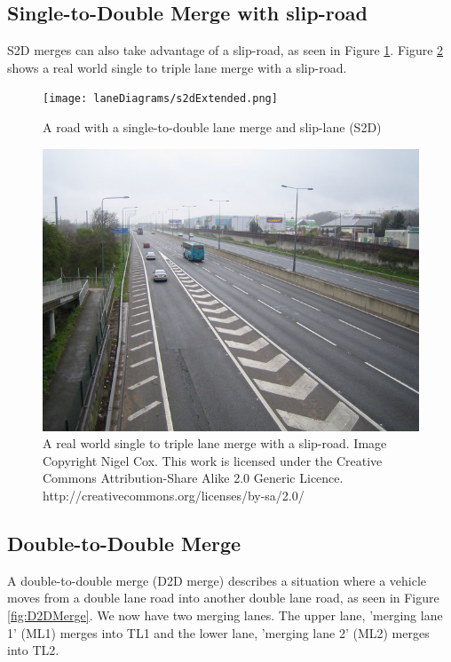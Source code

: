 \subsection{Single-to-Double Merge with slip-road}
\label{subsec:Single-to-Double Merge with slip-road}

S2D merges can also take advantage of a slip-road, as seen in Figure \ref{fig:S2DMergeExtended}. Figure \ref{fig:realLaneMerge} shows a real world single to triple lane merge with a slip-road.

\begin{figure}[htb]
\texttt{[image: laneDiagrams/s2dExtended.png]}
\caption{A road with a single-to{}-double lane merge and slip-lane (S2D)}
\label{fig:S2DMergeExtended}
\end{figure}

\begin{figure}[htb]
\includegraphics[width=\textwidth]{images/laneDiagrams/realLaneMerge.jpg}
\caption{A real world single to triple lane merge with a slip-road. Image Copyright Nigel Cox. This work is licensed under the Creative Commons Attribution-Share Alike 2.0 Generic Licence. http://creativecommons.org/licenses/by-sa/2.0/ \citep{realLaneMerge}}
\label{fig:realLaneMerge}
\end{figure}

\subsection{Double-to-Double Merge}
\label{subsec:Double-to-Double Merge}
A double-to-double merge (D2D merge) describes a situation where a vehicle moves from a double lane road into another double lane road, as seen in Figure \ref{fig:D2DMerge}. We now have two merging lanes. The upper lane, 'merging lane 1' (ML1) merges into TL1 and the lower lane, 'merging lane 2' (ML2) merges into TL2.

